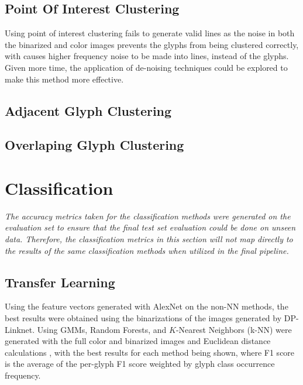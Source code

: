 \subsection{Point Of Interest Clustering}

Using point of interest clustering fails to generate valid lines as the noise in both the binarized and color images prevents the glyphs from being clustered correctly, with causes higher frequency noise to be made into lines, instead of the glyphs. Given more time, the application of de-noising techniques could be explored to make this method more effective.

\subsection{Adjacent Glyph Clustering}

\subsection{Overlaping Glyph Clustering}

\section{Classification}

\textit{The accuracy metrics taken for the classification methods were generated on the evaluation set to ensure that the final test set evaluation could be done on unseen data. Therefore, the classification metrics in this section will not map directly to the results of the same classification methods when utilized in the final pipeline.}

\subsection{Transfer Learning}

Using the feature vectors generated with AlexNet on the non-NN methods, the best results were obtained using the binarizations of the images generated by DP-Linknet. Using GMMs, Random Forests, and $K$-Nearest Neighbors (k-NN)  were generated with the full color and binarized images and Euclidean distance calculations , with the best results for each method being shown, where F1 score is the average of the per-glyph F1 score weighted by glyph class occurrence frequency.

